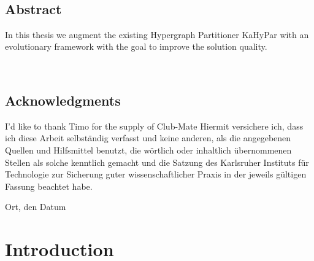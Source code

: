 \documentclass[a4paper,12pt,titlepage, BCOR7mm,headsepline]{scrbook}
\numberwithin{equation}{section}
\begin{document}

\ 
\newpage
\clearpage

\section*{Abstract}
In this thesis we augment the existing Hypergraph Partitioner KaHyPar with an evolutionary framework with the goal to improve the 
solution quality.
\vfill\vfill\vfill
\ 
\newpage
\clearpage
\ 
\newpage
\clearpage

\section*{Acknowledgments}

I'd like to thank Timo for the supply of Club-Mate
\vfill\vfill\vfill
Hiermit versichere ich, dass ich diese Arbeit selbständig verfasst und keine anderen, als die angegebenen Quellen und Hilfsmittel benutzt, die wörtlich oder inhaltlich übernommenen Stellen als solche kenntlich gemacht und die Satzung des Karlsruher Instituts für Technologie zur Sicherung guter wissenschaftlicher Praxis in der jeweils gültigen Fassung beachtet habe.

\bigskip
\vspace*{1cm}
\noindent
Ort, den Datum

\clearpage

\tableofcontents
\clearpage
\clearpage
\mainmatter
\pagestyle{plain}
\chapter{Introduction}
\pagestyle{headings}
\end{document}
